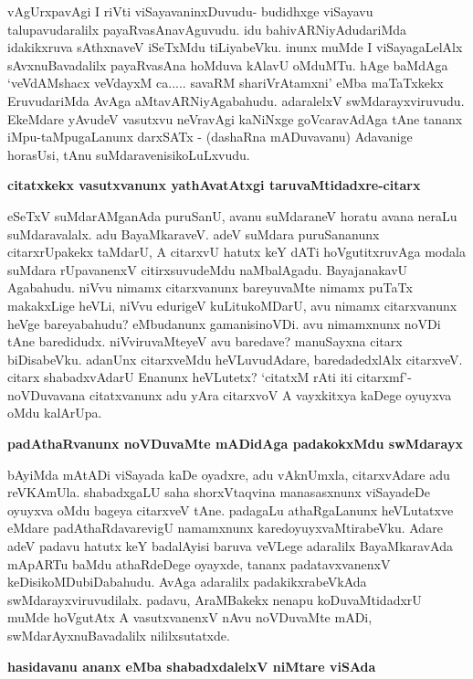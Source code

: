 \noindent
vAgUrxpavAgi I riVti viSayavaninxDuvudu- budidhxge viSayavu talupavudaralilx payaRvasAnavAguvudu. idu bahivARNiyAdudariMda idakikxruva sAthxnaveV iSeTxMdu tiLiyabeVku. inunx muMde I viSayagaLelAlx sAvxnuBavadalilx payaRvasAna hoMduva kAlavU oMduMTu. hAge baMdAga `veVdAMshacx veVdayxM ca..... savaRM shariVrAtamxni' eMba maTaTxkekx EruvudariMda AvAga aMtavARNiyAgabahudu. adaralelxV swMdarayxviruvudu. EkeMdare yAvudeV vasutxvu neVravAgi kaNiNxge goVcaravAdAga tAne tananx iMpu-taMpugaLanunx darxSATx - (dashaRna mADuvavanu) Adavanige horasUsi, tAnu suMdaravenisikoLuLxvudu.

{\bigskip
\noindent
{\large\bf citatxkekx vasutxvanunx yathAvatAtxgi taruvaMtidadxre-citarx}}\label{page200a}
\medskip

\noindent
eSeTxV suMdarAMganAda puruSanU, avanu suMdaraneV horatu avana neraLu suMdaravalalx. adu BayaMkaraveV. adeV suMdara puruSananunx citarxrUpakekx taMdarU, A citarxvU hatutx keY dATi hoVgutitxruvAga modala suMdara rUpavanenxV citirxsuvudeMdu naMbalAgadu. BayajanakavU Agabahudu. niVvu nimamx citarxvanunx bareyuvaMte nimamx puTaTx makakxLige heVLi, niVvu edurigeV kuLitukoMDarU, avu nimamx citarxvanunx heVge bareyabahudu? eMbudanunx gamanisinoVDi. avu nimamxnunx noVDi tAne baredidudx. niVviruvaMteyeV avu baredave? manuSayxna citarx biDisabeVku. adanUnx citarxveMdu heVLuvudAdare, baredadedxlAlx citarxveV. citarx shabadxvAdarU Enanunx heVLutetx? `citatxM rAti iti citarxmf'-noVDuvavana citatxvanunx adu yAra citarxvoV A vayxkitxya kaDege oyuyxva oMdu kalArUpa.

{\bigskip
\noindent
{\large\bf padAthaRvanunx noVDuvaMte mADidAga padakokxMdu swMdarayx}}\label{page201}
\medskip

\noindent
bAyiMda mAtADi viSayada kaDe oyadxre, adu vAknUmxla, citarxvAdare adu reVKAmUla. shabadxgaLU saha shorxVtaqvina manasasxnunx viSayadeDe oyuyxva oMdu bageya citarxveV tAne. padagaLu athaRgaLanunx heVLutatxve eMdare padAthaRdavarevigU namamxnunx karedoyuyxvaMtirabeVku. Adare adeV padavu hatutx keY badalAyisi baruva veVLege adaralilx BayaMkaravAda mApARTu baMdu athaRdeDege oyayxde, tananx padatavxvanenxV keDisikoMDubiDabahudu. AvAga adaralilx padakikxrabeVkAda swMdarayxviruvudilalx. padavu, AraMBakekx nenapu koDuvaMtidadxrU muMde hoVgutAtx A vasutxvanenxV nAvu noVDuvaMte mADi, swMdarAyxnuBavadalilx nililxsutatxde.

\eject

{\noindent
{\large\bf hasidavanu ananx eMba shabadxdalelxV niMtare viSAda}}\label{page201a}
\medskip

